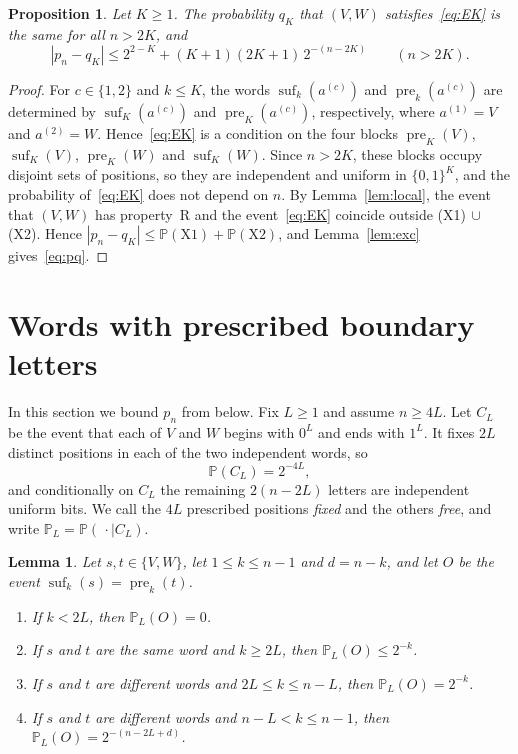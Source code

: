 \documentclass[11pt]{amsart}
\newtheorem{proposition}[theorem]{Proposition}
\newtheorem{lemma}[theorem]{Lemma}
\theoremstyle{remark}
\numberwithin{equation}{section}
\newcommand{\pre}{\operatorname{pre}}
\newcommand{\suf}{\operatorname{suf}}
\newcommand{\PP}{\mathbb{P}}
\newcommand{\bits}{\{0,1\}}
\begin{document}
\begin{proposition}\label{prop:qK}
Let $K\ge1$. The probability $q_K$ that $(V,W)$ satisfies~\eqref{eq:EK} is the same for all $n>2K$, and
\begin{equation}\label{eq:pq}
  |p_n-q_K|\le 2^{2-K}+(K+1)(2K+1)\,2^{-(n-2K)}\qquad(n>2K).
\end{equation}
\end{proposition}

\begin{proof}
For $c\in\{1,2\}$ and $k\le K$, the words $\suf_k(a^{(c)})$ and $\pre_k(a^{(c)})$ are determined by $\suf_K(a^{(c)})$ and $\pre_K(a^{(c)})$, respectively, where $a^{(1)}=V$ and $a^{(2)}=W$. Hence~\eqref{eq:EK} is a condition on the four blocks $\pre_K(V)$, $\suf_K(V)$, $\pre_K(W)$ and $\suf_K(W)$. Since $n>2K$, these blocks occupy disjoint sets of positions, so they are independent and uniform in $\bits^K$, and the probability of~\eqref{eq:EK} does not depend on $n$. By Lemma~\ref{lem:local}, the event that $(V,W)$ has property~R and the event~\eqref{eq:EK} coincide outside (X1)$\,\cup\,$(X2). Hence $|p_n-q_K|\le\PP(\mathrm{X1})+\PP(\mathrm{X2})$, and Lemma~\ref{lem:exc} gives~\eqref{eq:pq}.
\end{proof}

\section{Words with prescribed boundary letters}\label{sec:positive}

In this section we bound $p_n$ from below. Fix $L\ge1$ and assume $n\ge4L$. Let $C_L$ be the event that each of $V$ and $W$ begins with $0^L$ and ends with $1^L$. It fixes $2L$ distinct positions in each of the two independent words, so
\begin{equation}\label{eq:cyl}
  \PP(C_L)=2^{-4L},
\end{equation}
and conditionally on $C_L$ the remaining $2(n-2L)$ letters are independent uniform bits. We call the $4L$ prescribed positions \emph{fixed} and the others \emph{free}, and write $\PP_L=\PP(\,\cdot\mid C_L)$.

\begin{lemma}\label{lem:cond}
Let $s,t\in\{V,W\}$, let $1\le k\le n-1$ and $d=n-k$, and let $O$ be the event $\suf_k(s)=\pre_k(t)$.
\begin{enumerate}
\item If $k<2L$, then $\PP_L(O)=0$.
\item If $s$ and $t$ are the same word and $k\ge2L$, then $\PP_L(O)\le 2^{-k}$.
\item If $s$ and $t$ are different words and $2L\le k\le n-L$, then $\PP_L(O)=2^{-k}$.
\item If $s$ and $t$ are different words and $n-L<k\le n-1$, then $\PP_L(O)=2^{-(n-2L+d)}$.
\end{enumerate}
\end{lemma}
\end{document}
